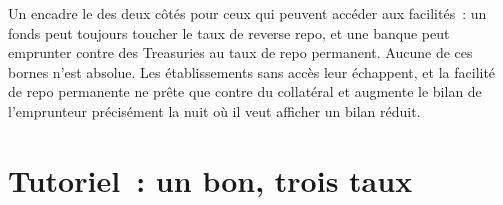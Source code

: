 \begin{remark}\label{rem:m2:money-markets:ceiling}
Un  encadre le  des deux côtés pour ceux qui peuvent accéder aux
facilités~: un fonds peut toujours toucher le taux de reverse repo, et une banque peut
emprunter contre des Treasuries au taux de repo permanent. Aucune de ces bornes
n'est absolue. Les établissements sans accès leur échappent, et la facilité de repo
permanente ne prête que contre du collatéral et augmente le bilan de l'emprunteur
précisément la nuit où il veut afficher un bilan réduit.
\end{remark}

\section{Tutoriel~: un bon, trois taux}\label{tut:m2:money-markets:bills}

